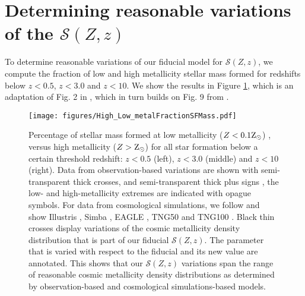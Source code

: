 \documentclass[twocolumn]{aastex631}
\newcommand{\SFRDzZ}{\ensuremath{\mathcal{S}(Z,z)}\xspace}
\begin{document}
\appendix

\section{Determining reasonable variations of the \SFRDzZ \label{app: reasonable var}}
To determine reasonable variations of our fiducial model for \SFRDzZ, we compute the fraction of low and high metallicity stellar mass formed for redshifts below $z<0.5$, $z < 3.0$ and $z<10$. We show the results in Figure \ref{fig: low high Z fraction}, which is an adaptation of Fig. 2 in \cite{Pakmor+2022}, which in turn builds on Fig. 9 from \cite{Chruslinska2019_obs}.

\begin{figure}
\centering
{}
\texttt{[image: figures/High\_Low\_metalFractionSFMass.pdf]}
\caption{Percentage of stellar mass formed at low metallicity ($Z < 0.1 \rm{Z_{\odot}}$) , versus high metallicity ($Z>\rm{Z_{\odot}}$) for all star formation below a certain threshold redshift: $z<0.5$ (left), $z < 3.0$ (middle) and $z<10$ (right). Data from observation-based variations are shown with semi-transparent thick crosses,  \citep[][]{Chruslinska2019_obs} and semi-transparent thick plus signs \citep[][]{Chruslinska+2021}, the low- and high-metallicity extremes are indicated with opague symbols. For data from cosmological simulations, we follow \cite{Pakmor+2022} and show Illustris \citep[][squares]{Vogelsberger+2014}, Simba \citep[][diamonds]{Dave+2019}, EAGLE \citep[][triangles]{Schaye+2015}, TNG50 and TNG100 \citep[][filled and open circles respectively]{FirstResTNG_Springel2018}. Black thin crosses display variations of the cosmic metallicity density distribution that is part of our fiducial \SFRDzZ. The parameter that is varied with respect to the fiducial and its new value are annotated. This shows that our \SFRDzZ variations span the range of reasonable cosmic metallicity density distributions as determined by observation-based and cosmological simulations-based models.
\label{fig: low high Z fraction}
  }
\end{figure}



\end{document}
